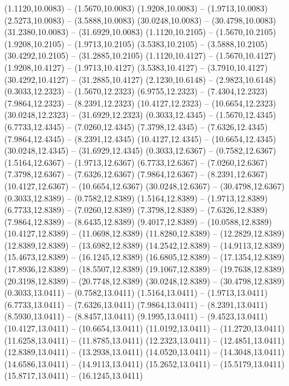 {\begin{scope}[shift={(#1,#2)}]
    (1.1120,10.0083) -- (1.5670,10.0083)
    (1.9208,10.0083) -- (1.9713,10.0083)
    (2.5273,10.0083) -- (3.5888,10.0083)
    (30.0248,10.0083) -- (30.4798,10.0083)
    (31.2380,10.0083) -- (31.6929,10.0083)
    (1.1120,10.2105) -- (1.5670,10.2105)
    (1.9208,10.2105) -- (1.9713,10.2105)
    (3.5383,10.2105) -- (3.5888,10.2105)
    (30.4292,10.2105) -- (31.2885,10.2105)
    (1.1120,10.4127) -- (1.5670,10.4127)
    (1.9208,10.4127) -- (1.9713,10.4127)
    (3.5383,10.4127) -- (3.7910,10.4127)
    (30.4292,10.4127) -- (31.2885,10.4127)
    (2.1230,10.6148) -- (2.9823,10.6148)
    (0.3033,12.2323) -- (1.5670,12.2323)
    (6.9755,12.2323) -- (7.4304,12.2323)
    (7.9864,12.2323) -- (8.2391,12.2323)
    (10.4127,12.2323) -- (10.6654,12.2323)
    (30.0248,12.2323) -- (31.6929,12.2323)
    (0.3033,12.4345) -- (1.5670,12.4345)
    (6.7733,12.4345) -- (7.0260,12.4345)
    (7.3798,12.4345) -- (7.6326,12.4345)
    (7.9864,12.4345) -- (8.2391,12.4345)
    (10.4127,12.4345) -- (10.6654,12.4345)
    (30.0248,12.4345) -- (31.6929,12.4345)
    (0.3033,12.6367) -- (0.7582,12.6367)
    (1.5164,12.6367) -- (1.9713,12.6367)
    (6.7733,12.6367) -- (7.0260,12.6367)
    (7.3798,12.6367) -- (7.6326,12.6367)
    (7.9864,12.6367) -- (8.2391,12.6367)
    (10.4127,12.6367) -- (10.6654,12.6367)
    (30.0248,12.6367) -- (30.4798,12.6367)
    (0.3033,12.8389) -- (0.7582,12.8389)
    (1.5164,12.8389) -- (1.9713,12.8389)
    (6.7733,12.8389) -- (7.0260,12.8389)
    (7.3798,12.8389) -- (7.6326,12.8389)
    (7.9864,12.8389) -- (8.6435,12.8389)
    (9.4017,12.8389) -- (10.0588,12.8389)
    (10.4127,12.8389) -- (11.0698,12.8389)
    (11.8280,12.8389) -- (12.2829,12.8389)
    (12.8389,12.8389) -- (13.6982,12.8389)
    (14.2542,12.8389) -- (14.9113,12.8389)
    (15.4673,12.8389) -- (16.1245,12.8389)
    (16.6805,12.8389) -- (17.1354,12.8389)
    (17.8936,12.8389) -- (18.5507,12.8389)
    (19.1067,12.8389) -- (19.7638,12.8389)
    (20.3198,12.8389) -- (20.7748,12.8389)
    (30.0248,12.8389) -- (30.4798,12.8389)
    (0.3033,13.0411) -- (0.7582,13.0411)
    (1.5164,13.0411) -- (1.9713,13.0411)
    (6.7733,13.0411) -- (7.6326,13.0411)
    (7.9864,13.0411) -- (8.2391,13.0411)
    (8.5930,13.0411) -- (8.8457,13.0411)
    (9.1995,13.0411) -- (9.4523,13.0411)
    (10.4127,13.0411) -- (10.6654,13.0411)
    (11.0192,13.0411) -- (11.2720,13.0411)
    (11.6258,13.0411) -- (11.8785,13.0411)
    (12.2323,13.0411) -- (12.4851,13.0411)
    (12.8389,13.0411) -- (13.2938,13.0411)
    (14.0520,13.0411) -- (14.3048,13.0411)
    (14.6586,13.0411) -- (14.9113,13.0411)
    (15.2652,13.0411) -- (15.5179,13.0411)
    (15.8717,13.0411) -- (16.1245,13.0411)

\end{scope}}
